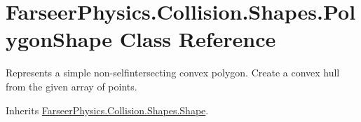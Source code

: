\hypertarget{class_farseer_physics_1_1_collision_1_1_shapes_1_1_polygon_shape}{\section{Farseer\+Physics.\+Collision.\+Shapes.\+Polygon\+Shape Class Reference}
\label{class_farseer_physics_1_1_collision_1_1_shapes_1_1_polygon_shape}
}


Represents a simple non-\/selfintersecting convex polygon. Create a convex hull from the given array of points.  




Inherits \hyperlink{class_farseer_physics_1_1_collision_1_1_shapes_1_1_shape}{Farseer\+Physics.\+Collision.\+Shapes.\+Shape}.

